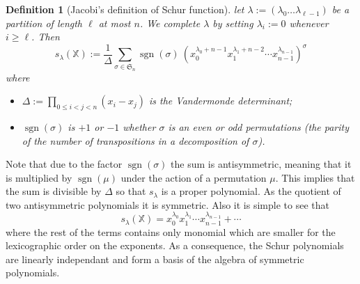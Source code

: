 \documentclass[12pt,a4paper]{article}
\newcommand{\SG}{{\mathfrak S}}
\newcommand{\sgn}{\operatorname{sgn}}
\newcommand{\alphX}{{\mathbb X}}
\newtheorem{DEFN}{Definition}
\begin{document}
\begin{DEFN}[Jacobi's definition of Schur function]
  let $\lambda:=(\lambda_0\dots\lambda_{\ell-1})$ be a partition of length
  $\ell$ at most $n$. We complete $\lambda$ by setting $\lambda_i:=0$ whenever
  $i\geq\ell$. Then
  \begin{equation}
    s_{\lambda} (\alphX) :=
    \frac{1}{\Delta}\sum_{\sigma\in\SG_n}
    \sgn(\sigma)\ 
    (x_0^{\lambda_0 + n-1}x_1^{\lambda_1 + n-2}\cdots x_{n-1}^{\lambda_{n-1}})^\sigma
  \end{equation}
  where
  \begin{itemize}
  \item $\Delta:=\prod_{0\leq i<j<n} (x_i - x_j)$ is the Vandermonde
    determinant;
  \item $\sgn(\sigma)$ is $+1$ or $-1$ whether $\sigma$ is an
    even or odd permutations (the parity of the number of transpositions in a
    decomposition of $\sigma$).
  \end{itemize}
\end{DEFN}
Note that due to the factor $\sgn(\sigma)$ the sum is antisymmetric, meaning
that it is multiplied by $\sgn(\mu)$ under the action of a permutation $\mu$.
This implies that the sum is divisible by $\Delta$ so that $s_\lambda$ is a
proper polynomial. As the quotient of two antisymmetric polynomials it is
symmetric. Also it is simple to see that
\begin{equation}
s_{\lambda} (\alphX) =
   x_0^{\lambda_0}x_1^{\lambda_1}\cdots x_{n-1}^{\lambda_{n-1}} +  \cdots
\end{equation}
where the rest of the terms contains only monomial which are smaller for the
lexicographic order on the exponents. As a consequence, the Schur polynomials are
linearly independant and form a basis of the algebra of symmetric
polynomials.
\end{document}
